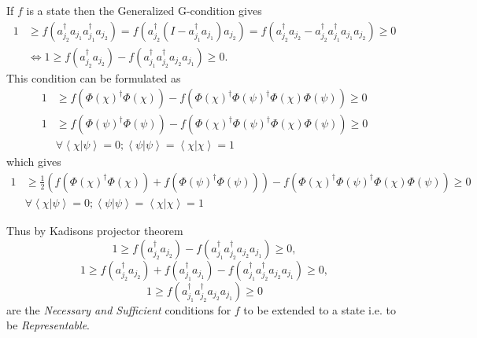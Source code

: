 \documentclass[aps,preprint]{revtex4}%
\begin{document}
If $f$ is a state then the Generalized G-condition gives
\begin{align}
1  &  \geq f\left(  a_{j_{2}}^{\dagger}a_{j_{1}}a_{j_{1}}^{\dagger}a_{j_{2}%
}\right)  =f\left(  a_{j_{2}}^{\dagger}\left(  I-a_{j_{1}}^{\dagger}a_{j_{1}%
}\right)  a_{j_{2}}\right)  =f\left(  a_{j_{2}}^{\dagger}a_{j_{2}}-a_{j_{2}%
}^{\dagger}a_{j_{1}}^{\dagger}a_{j_{1}}a_{j_{2}}\right)  \geq0\nonumber\\
&  \Leftrightarrow1\geq f\left(  a_{j_{2}}^{\dagger}a_{j_{2}}\right)
-f\left(  a_{j_{1}}^{\dagger}a_{j_{2}}^{\dagger}a_{j_{2}}a_{j_{1}}\right)
\geq0.
\end{align}
This condition can be formulated as
\begin{align}
1  &  \geq f\left(  \Phi\left(  \chi\right)  ^{\dagger}\Phi\left(
\chi\right)  \right)  -f\left(  \Phi\left(  \chi\right)  ^{\dagger}\Phi\left(
\psi\right)  ^{\dagger}\Phi\left(  \chi\right)  \Phi\left(  \psi\right)
\right)  \geq0\nonumber\\
1  &  \geq f\left(  \Phi\left(  \psi\right)  ^{\dagger}\Phi\left(
\psi\right)  \right)  -f\left(  \Phi\left(  \chi\right)  ^{\dagger}\Phi\left(
\psi\right)  ^{\dagger}\Phi\left(  \chi\right)  \Phi\left(  \psi\right)
\right)  \geq0\nonumber\\
&  \left.  \forall\right.  \left\langle \chi\left\vert \psi\right.
\right\rangle =0;\left\langle \psi\left\vert \psi\right.  \right\rangle
=\left\langle \chi\left\vert \chi\right.  \right\rangle =1
\end{align}
which gives
\begin{align}
1  &  \geq\frac{1}{2}\left(  f\left(  \Phi\left(  \chi\right)  ^{\dagger}%
\Phi\left(  \chi\right)  \right)  +f\left(  \Phi\left(  \psi\right)
^{\dagger}\Phi\left(  \psi\right)  \right)  \right)  -f\left(  \Phi\left(
\chi\right)  ^{\dagger}\Phi\left(  \psi\right)  ^{\dagger}\Phi\left(
\chi\right)  \Phi\left(  \psi\right)  \right)  \geq0\nonumber\\
&  \left.  \forall\right.  \left\langle \chi\left\vert \psi\right.
\right\rangle =0;\left\langle \psi\left\vert \psi\right.  \right\rangle
=\left\langle \chi\left\vert \chi\right.  \right\rangle =1
\end{align}


Thus by Kadisons projector theorem
\begin{equation}
1\geq f\left(  a_{j_{2}}^{\dagger}a_{j_{2}}\right)  -f\left(  a_{j_{1}%
}^{\dagger}a_{j_{2}}^{\dagger}a_{j_{2}}a_{j_{1}}\right)  \geq0,
\end{equation}%
\begin{equation}
1\geq f\left(  a_{j_{2}}^{\dagger}a_{j_{2}}\right)  +f\left(  a_{j_{1}%
}^{\dagger}a_{j_{1}}\right)  -f\left(  a_{j_{1}}^{\dagger}a_{j_{2}}^{\dagger
}a_{j_{2}}a_{j_{1}}\right)  \geq0,
\end{equation}%
\begin{equation}
1\geq f\left(  a_{j_{1}}^{\dagger}a_{j_{2}}^{\dagger}a_{j_{2}}a_{j_{1}%
}\right)  \geq0
\end{equation}
are the \emph{Necessary and Sufficient} conditions for $f$ to be extended to a
state i.e. to be \emph{Representable}.
\end{document}
